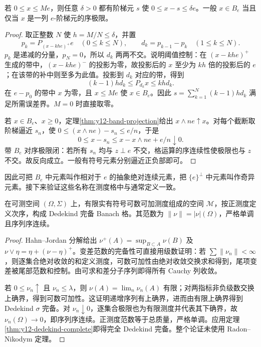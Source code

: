 \begin{theorem}\label{thm:y12-freudenthal}
若 $0\le x\le Me$，则任意 $\delta>0$ 都有阶梯元 $s$ 使 $0\le x-s\le\delta e$。一般 $x\in B_e$ 当且仅当 $x$ 是一列 $e$-阶梯元的序极限。
\end{theorem}
\begin{proof}
取正整数 $N$ 使 $h=M/N\le\delta$，并置
\[
 p_k=P_{(x-khe)^+}e\quad(0\le k\le N),\qquad
 d_k=p_{k-1}-p_k\quad(1\le k\le N).
\]
$p_k$ 是递减的分量，$p_N=0$，所以 $d_k$ 两两不交。说明阈值控制：在 $(x-khe)^+$ 生成的带中，$(x-khe)^-$ 的投影为零，故投影后的 $x$ 至少为 $kh$ 倍的投影后的 $e$；在该带的补中则至多为此值。投影到 $d_k$ 对应的带，得到
\[
 (k-1)h d_k\le P_{d_k}x\le kh d_k.
\]
在 $e-p_0$ 的带中 $x$ 为零，且 $x\le Me$ 使 $x\in B_e$。因此 $s=\sum_{k=1}^N(k-1)h d_k$ 满足所需误差界。$M=0$ 时直接取零。

若 $x\in B_e$、$x\ge0$，定理\ref{thm:y12-band-projection}给出 $x\wedge ne\uparrow x$。对每个截断取阶梯逼近 $s_n$，使 $0\le(x\wedge ne)-s_n\le e/n$，于是
\[
 0\le x-s_n\le x-x\wedge ne+e/n\downarrow0.
\]
带 $B_e$ 对序极限闭：若所有 $s_n$ 均与 $z\perp e$ 不交，格运算的序连续性使极限也与 $z$ 不交。故反向成立。一般有符号元素分别逼近正负部即可。
\end{proof}

因此可把 $B_e$ 中元素叫作相对于 $e$ 的抽象绝对连续元素，把 $\{e\}^\perp$ 中元素叫作奇异元素。接下来验证这些名称在测度格中与通常定义一致。

\begin{proposition}[有限测度构成的格]\label{prop:y12-measure-lattice}
在可测空间 $(\Omega,\Sigma)$ 上，有限实有符号可数可加测度组成的空间 $\mathcal M$，按正测度定义次序，构成 Dedekind 完备 Banach 格。其范数为 $\|\nu\|=|\nu|(\Omega)$，严格单调且序列序连续。
\end{proposition}
\begin{proof}
Hahn--Jordan 分解给出 $\nu^+(A)=\sup_{B\subset A}\nu(B)$ 及 $\nu\vee\eta=\eta+(\nu-\eta)^+$。变差范数的完备性可直接用级数证明：若 $\sum\|\nu_n\|<\infty$，则逐集合绝对收敛的和定义测度，可数可加性由绝对收敛交换求和得到，尾项变差被尾部范数和控制。由可求和差分子序列即得所有 Cauchy 列收敛。

若 $0\le\nu_n\uparrow$ 且 $\nu_n\le\lambda$，则 $\nu(A)=\lim_n\nu_n(A)$ 有限；对两指标非负级数交换上确界，得到可数可加性。这证明递增序列有上确界，进而由有限上确界得到 Dedekind $\sigma$ 完备。对 $\nu_n\downarrow0$，逐集合极限也为有限测度并代表其下确界，故 $\nu_n(\Omega)\to0$，即序列序连续。正测度范数等于总质量，严格单调。应用定理\ref{thm:y12-dedekind-complete}即得完全 Dedekind 完备。整个论证未使用 Radon--Nikodym 定理。
\end{proof}

